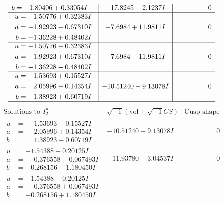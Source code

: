 \documentclass[1p]{elsarticle_modified}
\theoremstyle{definition}
\newcommand{\I}{\sqrt{-1}}
\begin{document}
$$\begin{array}{c|c|c}
\begin{aligned}
b &= -1.80406 + 0.33054 I\end{aligned}
 & -17.8245 - 2.1237 I & \phantom{-0.000000 } 0 \\ \hline\begin{aligned}
u &= -1.50776 + 0.32383 I \\
a &= -1.92923 - 0.67310 I \\
b &= -1.36228 + 0.48402 I\end{aligned}
 & -7.6984 + 11.9811 I & \phantom{-0.000000 } 0 \\ \hline\begin{aligned}
u &= -1.50776 - 0.32383 I \\
a &= -1.92923 + 0.67310 I \\
b &= -1.36228 - 0.48402 I\end{aligned}
 & -7.6984 - 11.9811 I & \phantom{-0.000000 } 0 \\ \hline\begin{aligned}
u &= \phantom{-}1.53693 + 0.15527 I \\
a &= \phantom{-}2.05996 - 0.14354 I \\
b &= \phantom{-}1.38923 + 0.60719 I\end{aligned}
 & -10.51240 - 9.13078 I & \phantom{-0.000000 } 0\\
 \hline 
 \end{array}$$\newpage$$\begin{array}{c|c|c}  
\text{Solutions to }I^u_{2}& \I (\text{vol} + \sqrt{-1}CS) & \text{Cusp shape}\\
 \hline 
\begin{aligned}
u &= \phantom{-}1.53693 - 0.15527 I \\
a &= \phantom{-}2.05996 + 0.14354 I \\
b &= \phantom{-}1.38923 - 0.60719 I\end{aligned}
 & -10.51240 + 9.13078 I & \phantom{-0.000000 } 0 \\ \hline\begin{aligned}
u &= -1.54388 + 0.20125 I \\
a &= \phantom{-}0.376558 - 0.067493 I \\
b &= -0.268156 - 1.180450 I\end{aligned}
 & -11.93780 + 3.04537 I & \phantom{-0.000000 } 0 \\ \hline\begin{aligned}
u &= -1.54388 - 0.20125 I \\
a &= \phantom{-}0.376558 + 0.067493 I \\
b &= -0.268156 + 1.180450 I\end{aligned}

\end{array}$$
\end{document}
